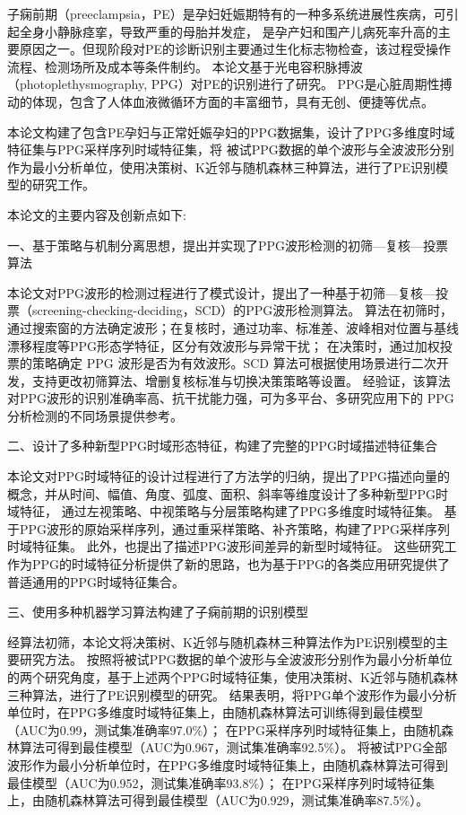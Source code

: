 \cleardoublepage
{}
子痫前期（preeclampsia，PE）是孕妇妊娠期特有的一种多系统进展性疾病，可引起全身小静脉痉挛，导致严重的母胎并发症，
是孕产妇和围产儿病死率升高的主要原因之一。但现阶段对PE的诊断识别主要通过生化标志物检查，该过程受操作流程、检测场所及成本等条件制约。
本论文基于光电容积脉搏波（photoplethysmography, PPG）对PE的识别进行了研究。
PPG是心脏周期性搏动的体现，包含了人体血液微循环方面的丰富细节，具有无创、便捷等优点。

本论文构建了包含PE孕妇与正常妊娠孕妇的PPG数据集，设计了PPG多维度时域特征集与PPG采样序列时域特征集，将
被试PPG数据的单个波形与全波波形分别作为最小分析单位，使用决策树、K近邻与随机森林三种算法，进行了PE识别模型的研究工作。

本论文的主要内容及创新点如下:

一、基于策略与机制分离思想，提出并实现了PPG波形检测的初筛—复核—投票算法

本论文对PPG波形的检测过程进行了模式设计，提出了一种基于初筛—复核—投票（screening-checking-deciding，SCD）的PPG波形检测算法。
算法在初筛时，通过搜索窗的方法确定波形；在复核时，通过功率、标准差、波峰相对位置与基线漂移程度等PPG形态学特征，区分有效波形与异常干扰；
在决策时，通过加权投票的策略确定 PPG 波形是否为有效波形。SCD 算法可根据使用场景进行二次开发，支持更改初筛算法、增删复核标准与切换决策策略等设置。
经验证，该算法对PPG波形的识别准确率高、抗干扰能力强，可为多平台、多研究应用下的 PPG 分析检测的不同场景提供参考。

二、设计了多种新型PPG时域形态特征，构建了完整的PPG时域描述特征集合

本论文对PPG时域特征的设计过程进行了方法学的归纳，提出了PPG描述向量的概念，并从时间、幅值、角度、弧度、面积、斜率等维度设计了多种新型PPG时域特征，
通过左视策略、中视策略与分层策略构建了PPG多维度时域特征集。
基于PPG波形的原始采样序列，通过重采样策略、补齐策略，构建了PPG采样序列时域特征集。
此外，也提出了描述PPG波形间差异的新型时域特征。
这些研究工作为PPG的时域特征分析提供了新的思路，也为基于PPG的各类应用研究提供了普适通用的PPG时域特征集合。

三、使用多种机器学习算法构建了子痫前期的识别模型

经算法初筛，本论文将决策树、K近邻与随机森林三种算法作为PE识别模型的主要研究方法。
按照将被试PPG数据的单个波形与全波波形分别作为最小分析单位的两个研究角度，基于上述两个PPG时域特征集，使用决策树、K近邻与随机森林三种算法，进行了PE识别模型的研究。
结果表明，将PPG单个波形作为最小分析单位时，在PPG多维度时域特征集上，由随机森林算法可训练得到最佳模型（AUC为0.99，测试集准确率97.0\%）；
在PPG采样序列时域特征集上，由随机森林算法可得到最佳模型（AUC为0.967，测试集准确率92.5\%）。
将被试PPG全部波形作为最小分析单位时，在PPG多维度时域特征集上，由随机森林算法可得到最佳模型（AUC为0.952，测试集准确率93.8\%）；
在PPG采样序列时域特征集上，由随机森林算法可得到最佳模型（AUC为0.929，测试集准确率87.5\%）。

